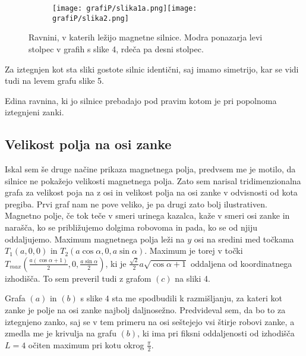 \documentclass[12pt, a4paper]{article}
\begin{document}
\begin{figure}[h]
\hspace{-50pt}
  \begin{subfigure}[b]{0.6\textwidth}
    \centering
    \texttt{[image: grafiP/slika1a.png]}\texttt{[image: grafiP/slika2.png]}
    \label{graf}
  \end{subfigure}
  \caption{Ravnini, v katerih ležijo magnetne silnice. Modra ponazarja levi stolpec v grafih s slike 4, rdeča pa desni stolpec.}
\end{figure}

Za iztegnjen kot sta sliki gostote silnic identični, saj imamo simetrijo, kar se vidi tudi na levem grafu slike 5. 

Edina ravnina, ki jo silnice prebadajo pod pravim kotom je pri popolnoma iztegnjeni zanki. 



\subsection{Velikost polja na osi zanke}
Iskal sem še druge načine prikaza magnetnega polja, predvsem me je motilo, da silnice ne pokažejo velikosti magnetnega polja. Zato sem narisal tridimenzionalna grafa za velikost poja na z osi in velikost polja na osi zanke v odvisnosti od kota pregiba. Prvi graf nam ne pove veliko, je pa drugi zato bolj ilustrativen. Magnetno polje, če tok teče v smeri urinega kazalca, kaže v smeri osi zanke in narašča, ko se približujemo dolgima robovoma in pada, ko se od njiju oddaljujemo. %
Maximum magnetnega polja leži na $y$ osi na sredini med točkama $T_1 (a, 0, 0)$ in $T_2 (a \cos \alpha, 0, a \sin \alpha)$. Maximum je torej v točki $T_{max} (\frac{a(\cos \alpha +1)}{2}, 0, \frac{a \sin \alpha}{2})$, ki je $\frac{\sqrt{2}}{2}a \sqrt{\cos \alpha +1}$ oddaljena od koordinatnega izhodišča. To sem preveril tudi z grafom $(c)$ na sliki 4. 

Grafa $(a)$ in $(b)$ s slike $4$ sta me spodbudili k razmišljanju, za kateri kot zanke je polje na osi zanke najbolj daljnosežno. Predvideval sem, da bo to za iztegnjeno zanko, saj se v tem primeru na osi seštejejo vsi štirje robovi zanke, a zmedla me je krivulja na grafu $(b)$, ki ima pri fiksni oddaljenosti od izhodišča $L = 4$ očiten maximum pri kotu okrog $\frac{\pi}{2}$.
\end{document}
